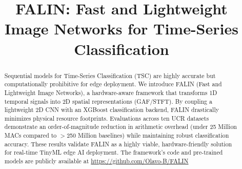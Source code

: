 \documentclass[10pt,conference]{IEEEtran}
\begin{document}
\title{FALIN: Fast and Lightweight Image Networks for Time-Series Classification}

\newif\iffinal
\finaltrue
\newcommand{\review}[1]{\textcolor[rgb]{0.19607843137254902, 0.4196078431372549, 0.6588235294117647}{#1}}  %
\newcommand{\todo}[1]{\textcolor[rgb]{0.6588235294117647, 0.19607843137254902, 0.19607843137254902}{#1}}     %
\newcommand{\citethis}[1]{\textcolor[rgb]{0.3686274509803922, 0.5411764705882353, 0.3764705882352941}{#1}} %

\iffinal
  \author{
  }
\else
  \author{Sibgrapi paper ID: \cmtid \\ }
\fi

\maketitle


\begin{abstract}
Sequential models for Time-Series Classification (TSC) are highly accurate but computationally prohibitive for edge deployment. We introduce FALIN (\review{Fa}st and \review{L}ightweight \review{I}mage \review{N}etworks), a hardware-aware framework that transforms 1D temporal signals into 2D spatial representations (GAF/STFT). By coupling a lightweight 2D CNN with an XGBoost classification backend, FALIN drastically minimizes physical resource footprints. Evaluations across ten UCR datasets demonstrate an order-of-magnitude reduction in arithmetic overhead (under 25 Million MACs compared to $>$250 Million baselines) while maintaining robust classification accuracy. These results validate FALIN as a highly viable, hardware-friendly solution for real-time TinyML edge AI deployment. The framework's code and pre-trained models are publicly available at \url{https://github.com/Olavo-B/FALIN}
\end{abstract}

\IEEEpeerreviewmaketitle

\end{document}
